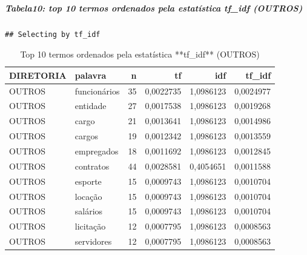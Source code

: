 \documentclass[]{article}
\newenvironment{Shaded}{\begin{snugshade}}{\end{snugshade}}
\newcommand{\KeywordTok}[1]{\textcolor[rgb]{0.13,0.29,0.53}{\textbf{#1}}}
\newcommand{\DataTypeTok}[1]{\textcolor[rgb]{0.13,0.29,0.53}{#1}}
\newcommand{\DecValTok}[1]{\textcolor[rgb]{0.00,0.00,0.81}{#1}}
\newcommand{\StringTok}[1]{\textcolor[rgb]{0.31,0.60,0.02}{#1}}
\newcommand{\OperatorTok}[1]{\textcolor[rgb]{0.81,0.36,0.00}{\textbf{#1}}}
\newcommand{\NormalTok}[1]{#1}
\let\oldsubparagraph\subparagraph
\renewcommand{\subparagraph}[1]{\oldsubparagraph{#1}\mbox{}}
\begin{document}
\subparagraph{\texorpdfstring{Tabela10: top 10 termos ordenados pela
estatística \textbf{tf\_idf}
(OUTROS)}{Tabela10: top 10 termos ordenados pela estatística tf\_idf (OUTROS)}}\label{tabela10-top-10-termos-ordenados-pela-estatistica-tf_idf-outros}

\begin{Shaded}
\end{Shaded}

\begin{verbatim}
## Selecting by tf_idf
\end{verbatim}

\begin{table}[!h]

\caption{\label{tab:unnamed-chunk-36}Top 10 termos ordenados pela estatística **tf_idf** (OUTROS)}
\centering
\begin{tabular}{llrrrr}
\toprule
DIRETORIA & palavra & n & tf & idf & tf\_idf\\
\midrule
\rowcolor{gray!6}  OUTROS & funcionários & 35 & 0,0022735 & 1,0986123 & 0,0024977\\
OUTROS & entidade & 27 & 0,0017538 & 1,0986123 & 0,0019268\\
\rowcolor{gray!6}  OUTROS & cargo & 21 & 0,0013641 & 1,0986123 & 0,0014986\\
OUTROS & cargos & 19 & 0,0012342 & 1,0986123 & 0,0013559\\
\rowcolor{gray!6}  OUTROS & empregados & 18 & 0,0011692 & 1,0986123 & 0,0012845\\
\addlinespace
OUTROS & contratos & 44 & 0,0028581 & 0,4054651 & 0,0011588\\
\rowcolor{gray!6}  OUTROS & esporte & 15 & 0,0009743 & 1,0986123 & 0,0010704\\
OUTROS & locação & 15 & 0,0009743 & 1,0986123 & 0,0010704\\
\rowcolor{gray!6}  OUTROS & salários & 15 & 0,0009743 & 1,0986123 & 0,0010704\\
OUTROS & licitação & 12 & 0,0007795 & 1,0986123 & 0,0008563\\
\addlinespace
\rowcolor{gray!6}  OUTROS & servidores & 12 & 0,0007795 & 1,0986123 & 0,0008563\\
\bottomrule
\end{tabular}
\end{table}
\end{document}

